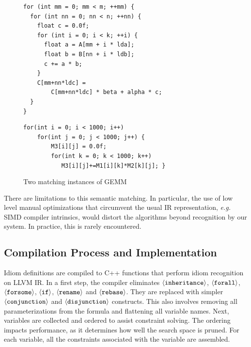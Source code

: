 \begin{figure}[ht]
\begin{lstlisting}[numbers=none,basicstyle=\linespread{1.133}\footnotesize\ttfamily]
for (int mm = 0; mm < m; ++mm) {
  for (int nn = 0; nn < n; ++nn) {
    float c = 0.0f;
    for (int i = 0; i < k; ++i) {
      float a = A[mm + i * lda]; 
      float b = B[nn + i * ldb];
      c += a * b;
    }
    C[mm+nn*ldc] =
        C[mm+nn*ldc] * beta + alpha * c;
  }
}
\end{lstlisting}
\vspace{1em}
\begin{lstlisting}[numbers=none,basicstyle=\linespread{1.133}\footnotesize\ttfamily]
for(int i = 0; i < 1000; i++)
    for(int j = 0; j < 1000; j++) {
        M3[i][j] = 0.0f;
        for(int k = 0; k < 1000; k++)
           M3[i][j]+=M1[i][k]*M2[k][j]; }
\end{lstlisting}
\vspace{-0.3cm}
\caption{Two matching instances of GEMM}
\label{fig:gemmexamples}
\end{figure}

    There are limitations to this semantic matching.
    In particular, the use of low level manual optimizations that circumvent the
    usual IR representation, {\em e.g.}  SIMD compiler intrinsics, would distort
    the algorithms beyond recognition by our system.
    In practice, this is rarely encountered.



\subsection{Compilation Process and Implementation}
\label{sec:compilation}

    Idiom definitions are compiled to C++ functions that perform idiom
    recognition on LLVM IR.
    In a first step, the compiler eliminates
    $\left<\text{\tt inheritance}\right>$, $\left<\text{\tt forall}\right>$,
    $\left<\text{\tt forsome}\right>$, $\left<\text{\tt if}\right>$,
    $\left<\text{\tt rename}\right>$ and $\left<\text{\tt rebase}\right>$.
    They are replaced with simpler $\left<\text{\tt conjunction}\right>$ and
    $\left<\text{\tt disjunction}\right>$ constructs.
    This also involves removing all parameterizations from the formula and
    flattening all variable names.
    Next, variables are collected and ordered to assist constraint solving.
    The ordering impacts performance, as it determines how well the search space
    is pruned. 
    For each variable, all the constraints associated with the variable are
    assembled.

